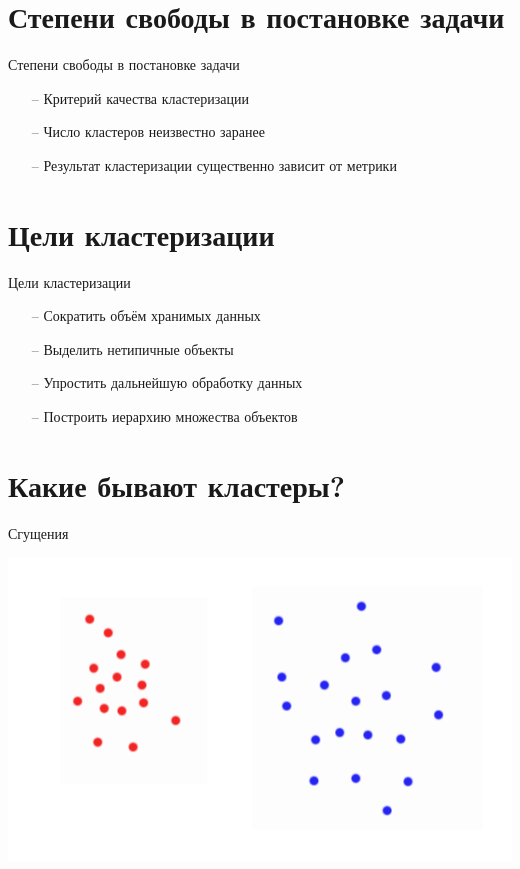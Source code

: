 \documentclass[10pt]{beamer}
\begin{document}
\section{Степени свободы в постановке задачи}

\begin{frame}{Степени свободы в постановке задачи}
	\begin{itemize} [<+- | alert@+>]
		\item[--] Критерий качества кластеризации
		\item[--] Число кластеров неизвестно заранее
		\item[--] Результат кластеризации существенно зависит от метрики
	\end{itemize}
\end{frame}

\section{Цели кластеризации}

\begin{frame}{Цели кластеризации}
	\begin{itemize} [<+- | alert@+>]
		\item[--] Сократить объём хранимых данных
		\item[--] Выделить нетипичные объекты
		\item[--] Упростить дальнейшую обработку данных
		\item[--] Построить иерархию множества объектов				
	\end{itemize}
\end{frame}

\section{Какие бывают кластеры?}

\begin{frame}{Сгущения}
	\begin{center}
    \includegraphics[height=0.6 \textheight, keepaspectratio = true]{images/cluster1}  
	\end{center}
\end{frame}
\end{document}
